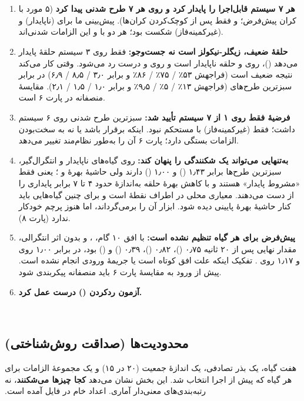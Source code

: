 ‫\documentclass[a4paper,12pt]{article}
\begin{document}
‫\begin{enumerate}
‫\item \textbf{ هر ۷ سیستم قابل‌اجرا را پایدار کرد و  روی هر ۷ طرح شدنی پیدا کرد} (۵ مورد با کران پیش‌فرض؛  و  فقط پس از کوچک‌کردن کران‌ها). پیش‌بینی ما برای  (ناپایدار) و  (غیرکمینه‌فاز) شکست بود؛ هر دو با  و این الزامات شدنی‌اند.
‫\item \textbf{حلقهٔ ضعیف، زیگلر-نیکولز است نه جست‌وجو:} فقط روی ۳ سیستم حلقهٔ پایدار می‌دهد ()، روی  و  حلقه ناپایدار است و روی  و  درست رد می‌شود. وقتی کار می‌کند نتیجه ضعیف است (فراجهش ۵۳٪ / ۷۵٪ / ۸۶٪ و  برابر ۳٫۰ / ۸٫۵ / ۶٫۹) در برابر سبزترین طرح‌های  (فراجهش ۱۳٪ / ۵٪ / ۹٫۵٪ و  برابر ۱٫۰ / ۱٫۵ / ۲٫۱). مقایسهٔ منصفانه در پارت ۶ است.
‫\item \textbf{فرضیهٔ  فقط روی ۱ از ۷ سیستم تأیید شد:} سبزترین طرح شدنی روی ۶ سیستم  داشت؛ فقط  (غیرکمینه‌فاز) با  مستحکم نبود. اینکه  برقرار باشد یا نه به سخت‌بودن الزامات بستگی دارد؛ پارت ۶ آن را به‌طور نظام‌مند تغییر می‌دهد.
‫\item \textbf{ به‌تنهایی می‌تواند یک شکنندگی را پنهان کند:} روی گیاه‌های ناپایدار و انتگرال‌گیر، سبزترین طرح‌ها  برابر ۱٫۴۳ () و ۱٫۰۰ () دارند ولی حاشیهٔ بهرهٔ  و ؛ یعنی فقط «مشروط پایدار» هستند و با کاهش بهرهٔ حلقه به‌اندازهٔ حدود ۴ تا ۷ برابر پایداری را از دست می‌دهند.  معیاری محلی در اطراف نقطهٔ  است و برای چنین گیاه‌هایی باید کنار حاشیهٔ بهرهٔ پایینی دیده شود. ابزار آن را برمی‌گرداند، اما هنوز پرچم خودکار ندارد (پارت ۸).
‫\item \textbf{ پیش‌فرض برای هر گیاه تنظیم نشده است:} با افق ۱۰ گام، ،  و بدون اثر انتگرالی، مقدار نهایی پس از ۲۰ ثانیه ۰٫۷۵ ()، ۰٫۸۲ ()، ۰٫۳۹ () و  () بود، در برابر ۱٫۰۰ روی  و ۱٫۱۷ روی . تفکیک اینکه علت افق کوتاه است یا جریمهٔ ورودی انجام نشده است. پیش از ورود  به مقایسهٔ پارت ۶ باید منصفانه پیکربندی شود.
‫\item \textbf{آزمون رد‌کردن () درست عمل کرد.}
‫\end{enumerate}
‫
‫\subsection{محدودیت‌ها (صداقت روش‌شناختی)}
‫هفت گیاه، یک بذر تصادفی، یک اندازهٔ جمعیت (۲۰ در ۱۵) و یک مجموعهٔ الزامات برای هر گیاه که پیش از اجرا انتخاب شد. این بخش نشان می‌دهد \textbf{کجا چیزها می‌شکنند}، نه رتبه‌بندی‌های معنی‌دار آماری. اعداد خام در فایل \texttt{} آمده است.
\end{document}
